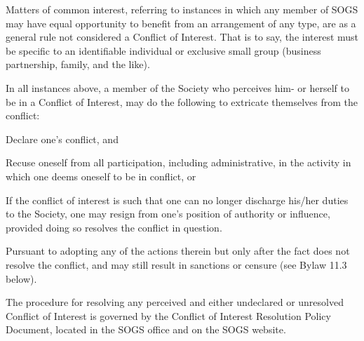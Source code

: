 \begin{longenum}[ label*=\thesection.\arabic*., align=left]
\begin{itemize}
    \end{itemize}
    \begin{longenum}[ label*=\arabic*., align=left]
	\item Matters of common interest, referring to instances in which any member of SOGS may have equal opportunity to  benefit from an arrangement of any type, are as a general  rule not considered a Conflict of Interest. That is to say, the interest must be specific to an identifiable individual or exclusive small group (business partnership, family, and the like). 
	\end{longenum}
    \item In all instances above, a member of the Society who perceives him- or herself to be in a Conflict of Interest, may do the following to extricate themselves from the conflict:
    \begin{longenum}[ label*=\arabic*., align=left]
		\item Declare one's conflict, and
        \begin{longenum}[ label*=\arabic*., align=left]
			\item Recuse oneself from all participation, including administrative, in the activity in which one deems oneself to be in conflict, or
            \item If the conflict of interest is such that one can no longer discharge his/her duties to the Society, one may resign from one's position of authority or influence, provided doing so resolves the conflict in question.
		\end{longenum}
        \item Pursuant to adopting any of the actions therein but only after the fact does not resolve the conflict, and may still result in sanctions or censure (see Bylaw 11.3 below).
	\end{longenum}
    \item The procedure for resolving any perceived and either undeclared or unresolved Conflict of Interest is governed by the Conflict of Interest Resolution Policy Document, located in the SOGS office and on the SOGS website.
    
\end{longenum}
\newpage

